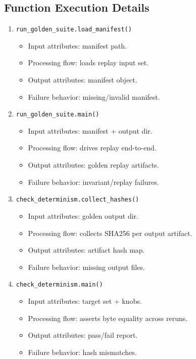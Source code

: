 \documentclass[11pt,a4paper]{article}
\begin{document}
\subsection*{Function Execution Details}
\begin{enumerate}[leftmargin=*]
  \item \texttt{run\_golden\_suite.load\_manifest()}
  \begin{itemize}[leftmargin=*]
    \item Input attributes: manifest path.
    \item Processing flow: loads replay input set.
    \item Output attributes: manifest object.
    \item Failure behavior: missing/invalid manifest.
  \end{itemize}
  \item \texttt{run\_golden\_suite.main()}
  \begin{itemize}[leftmargin=*]
    \item Input attributes: manifest + output dir.
    \item Processing flow: drives replay end-to-end.
    \item Output attributes: golden replay artifacts.
    \item Failure behavior: invariant/replay failures.
  \end{itemize}
  \item \texttt{check\_determinism.collect\_hashes()}
  \begin{itemize}[leftmargin=*]
    \item Input attributes: golden output dir.
    \item Processing flow: collects SHA256 per output artifact.
    \item Output attributes: artifact hash map.
    \item Failure behavior: missing output files.
  \end{itemize}
  \item \texttt{check\_determinism.main()}
  \begin{itemize}[leftmargin=*]
    \item Input attributes: target set + knobs.
    \item Processing flow: asserts byte equality across reruns.
    \item Output attributes: pass/fail report.
    \item Failure behavior: hash mismatches.
  \end{itemize}
\end{enumerate}
\end{document}
